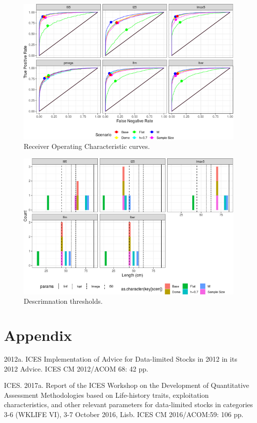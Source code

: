 \documentclass[12pt,doublespacing,a4paper]{ouparticle}
\begin{document}
\newpage
\begin{figure}[h]
\centering
\includegraphics[width=\textwidth]{roc-overfish-roc-pollack-1.png}
\caption{Receiver Operating Characteristic curves.}
\label{fig:roc}
\end{figure}


\newpage
\begin{figure}[h]
\centering
\includegraphics[width=\textwidth]{roc-overfish-ref-pollack-1.png}
\caption{Descrimnation thresholds.}
\label{fig:discrim}
\end{figure}

\clearpage
\section{Appendix}


2012a. ICES Implementation of Advice for Data-limited Stocks in 2012 in its 2012 Advice. ICES CM 2012/ACOM 68: 42 pp.

ICES. 2017a. Report of the ICES Workshop on the Development of Quantitative Assessment Methodologies based on Life-history traits, exploitation characteristics, and other relevant parameters for data-limited stocks in categories 3-6 (WKLIFE VI), 3-7 October 2016, Lisb. ICES CM 2016/ACOM:59: 106 pp.
\end{document}
